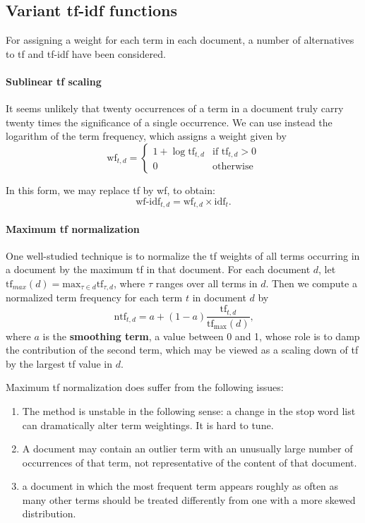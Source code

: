 \documentclass[letterpaper,11pt]{article}
\begin{document}
\subsection{Variant tf-idf functions}
For assigning a weight for each term in each document, a number of alternatives to tf and tf-idf have been considered.

\paragraph{Sublinear tf scaling}
It seems unlikely that twenty occurrences of a term in a document truly carry twenty times the significance of a single occurrence. We can use instead the logarithm of the term frequency, which assigns a weight given by
\[
\textrm{wf}_{t,d} = \begin{cases} 1+\log\textrm{tf}_{t,d} & \textrm{if } \textrm{tf}_{t,d} > 0 \\ 0 & \textrm{otherwise} \end{cases}
\]

In this form, we may replace tf by wf, to obtain:
\[
\textrm{wf-idf}_{t,d}=\textrm{wf}_{t,d} \times \textrm{idf}_t.
\]

\paragraph{Maximum tf normalization}
One well-studied technique is to normalize the tf weights of all terms occurring in a document by the maximum tf in that document. For each document $d$, let $\textrm{tf}_{max}(d) = \textrm{max}_{\tau \in d} \textrm{tf}_{\tau,d}$, where $\tau$ ranges over all terms in $d$. Then we compute a normalized term frequency for each term $t$ in document $d$ by
\[
\textrm{ntf}_{t,d} = a + (1 - a) \frac{\textrm{tf}_{t,d}}{\textrm{tf}_{\textrm{max}}(d)}\textrm{,} 
\]
where $a$ is the \textbf{smoothing term}, a value between 0 and 1, whose role is to damp the contribution of the second term, which may be viewed as a scaling down of tf by the largest tf value in $d$.

Maximum tf normalization does suffer from the following issues:
\begin{enumerate}
    \item The method is unstable in the following sense: a change in the stop word list can dramatically alter term weightings. It is hard to tune.
    \item A document may contain an outlier term with an unusually large number of occurrences of that term, not representative of the content of that document.
    \item a document in which the most frequent term appears roughly as often as many other terms should be treated differently from one with a more skewed distribution.
\end{enumerate}
\end{document}
